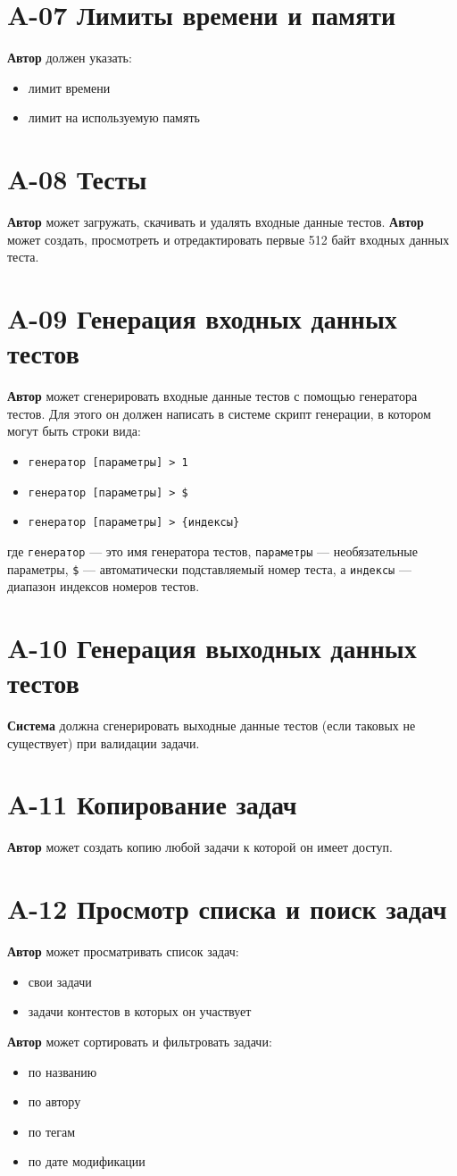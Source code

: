 \documentclass{book}
\newcommand{\newcard}[1]{\newpage \section*{#1}}
\begin{document}
\newcard{A-07 Лимиты времени и памяти}
\textbf{Автор} должен указать:
\begin{itemize}\setlength{\itemsep}{0pt}
	\item лимит времени
	\item лимит на используемую память
\end{itemize}

\newcard{A-08 Тесты}
\textbf{Автор} может загружать, скачивать и удалять входные данные тестов.
\textbf{Автор} может создать, просмотреть и отредактировать первые 512 байт входных данных теста.

\newcard{A-09 Генерация входных данных тестов}
\textbf{Автор} может сгенерировать входные данные тестов с помощью генератора тестов.
Для этого он должен написать в системе скрипт генерации, в котором могут быть строки вида:
\begin{itemize}\setlength{\itemsep}{0pt}
	\item \texttt{генератор [параметры] > 1}
	\item \texttt{генератор [параметры] > \$}
	\item \texttt{генератор [параметры] > \{индексы\}}
\end{itemize}
где \texttt{генератор} — это имя генератора тестов, \texttt{параметры} — необязательные параметры, \texttt{\$} — автоматически подставляемый номер теста, а \texttt{индексы} — диапазон индексов номеров тестов.

\newcard{A-10 Генерация выходных данных тестов}
\textbf{Система} должна сгенерировать выходные данные тестов (если таковых не существует) при валидации задачи.

\newcard{A-11 Копирование задач}
\textbf{Автор} может создать копию любой задачи к которой он имеет доступ.

\newcard{A-12 Просмотр списка и поиск задач}
\textbf{Автор} может просматривать список задач:
\begin{itemize}\setlength{\itemsep}{0pt}
	\item свои задачи
	\item задачи контестов в которых он участвует 
\end{itemize}

\textbf{Автор} может сортировать и фильтровать задачи:
\begin{itemize}\setlength{\itemsep}{0pt}
	\item по названию
	\item по автору
	\item по тегам
	\item по дате модификации 
\end{itemize}
\end{document}
